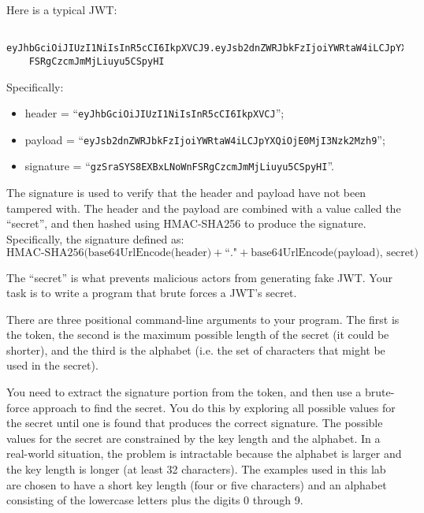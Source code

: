 \documentclass[12pt]{article}
\renewcommand{\_}{\kern-1.5pt\textunderscore\kern-1.5pt}
\begin{document}
\noindent
Here is a typical JWT: \par


\vspace{1em} {\scriptsize
\begin{verbatim}
    eyJhbGciOiJIUzI1NiIsInR5cCI6IkpXVCJ9.eyJsb2dnZWRJbkFzIjoiYWRtaW4iLCJpYXQiOjE0MjI3Nzk2Mzh9.gzSraSYS8EXBxLN_oWn
    FSRgCzcmJmMjLiuyu5CSpyHI
\end{verbatim}
}

Specifically:
\begin{itemize}[noitemsep]
  \item header = ``{\tt eyJhbGciOiJIUzI1NiIsInR5cCI6IkpXVCJ}'';
  \item payload = ``{\tt eyJsb2dnZWRJbkFzIjoiYWRtaW4iLCJpYXQiOjE0MjI3Nzk2Mzh9}'';
  \item signature = ``{\tt gzSraSYS8EXBxLN\_oWnFSRgCzcmJmMjLiuyu5CSpyHI}''.
\end{itemize}

The signature is used to verify that the header and payload have not been tampered with. The header and the payload are combined with a value called the ``secret'', and then hashed using HMAC-SHA256 to produce the signature. Specifically, the signature defined as:
\[
\mbox{HMAC-SHA256(base64UrlEncode(header)} + \mbox{``."} + \mbox{base64UrlEncode(payload), secret)}
\]

\noindent The ``secret''  is what prevents malicious actors from generating fake JWT. Your task is to write a program that brute forces a JWT’s secret. \par


\vspace*{1em} \noindent There are three positional command-line arguments to your program. The first is the token, the second is the maximum possible length of the secret (it could be shorter), and the third is the alphabet (i.e. the set of characters that might be used in the secret).\par

\vspace*{1em} \noindent You need to extract the signature portion from the token, and then use a brute-force approach to find the secret. You do this by exploring all possible values for the secret until one is found that produces the correct signature. The possible values for the secret are constrained by the key length and the alphabet. In a real-world situation, the problem is intractable because the alphabet is larger and the key length is longer (at least 32 characters). The examples used in this lab are chosen to have a short key length (four or five characters) and an alphabet consisting of the lowercase letters plus the digits 0 through 9.\par
\end{document}
